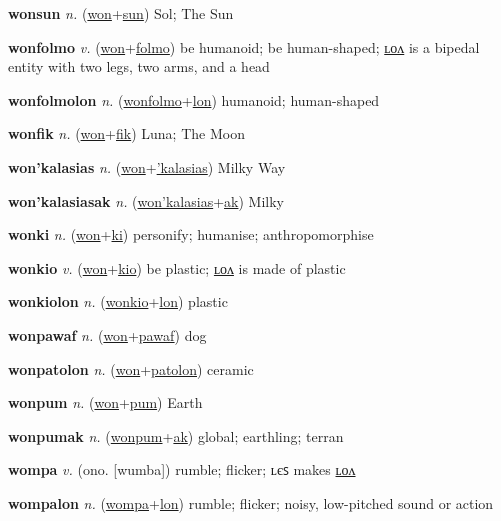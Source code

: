 \textbf{\hypertarget{wonsun}{wonsun}} \textit{n.} (\hyperlink{won}{won}+\allowbreak \hyperlink{sun}{sun})
Sol; The Sun

\textbf{\hypertarget{wonfolmo}{wonfolmo}} \textit{v.} (\hyperlink{won}{won}+\allowbreak \hyperlink{folmo}{folmo})
be humanoid; be human-shaped; \hyperlink{wonfolmolon}{ʟᴏᴧ} is a bipedal entity with two legs, two arms, and a head

\textbf{\hypertarget{wonfolmolon}{wonfolmolon}} \textit{n.} (\hyperlink{wonfolmo}{wonfolmo}+\allowbreak \hyperlink{lon}{lon})
humanoid; human-shaped

\textbf{\hypertarget{wonfik}{wonfik}} \textit{n.} (\hyperlink{won}{won}+\allowbreak \hyperlink{fik}{fik})
Luna; The Moon

\textbf{\hypertarget{won'kalasias}{won'kalasias}} \textit{n.} (\hyperlink{won}{won}+\allowbreak \hyperlink{'kalasias}{'kalasias})
Milky Way

\textbf{\hypertarget{won'kalasiasak}{won'kalasiasak}} \textit{n.} (\hyperlink{won'kalasias}{won'kalasias}+\allowbreak \hyperlink{ak}{ak})
Milky

\textbf{\hypertarget{wonki}{wonki}} \textit{n.} (\hyperlink{won}{won}+\allowbreak \hyperlink{ki}{ki})
personify; humanise; anthropomorphise

\textbf{\hypertarget{wonkio}{wonkio}} \textit{v.} (\hyperlink{won}{won}+\allowbreak \hyperlink{kio}{kio})
be plastic; \hyperlink{wonkiolon}{ʟᴏᴧ} is made of plastic

\textbf{\hypertarget{wonkiolon}{wonkiolon}} \textit{n.} (\hyperlink{wonkio}{wonkio}+\allowbreak \hyperlink{lon}{lon})
plastic

\textbf{\hypertarget{wonpawaf}{wonpawaf}} \textit{n.} (\hyperlink{won}{won}+\allowbreak \hyperlink{pawaf}{pawaf})
dog

\textbf{\hypertarget{wonpatolon}{wonpatolon}} \textit{n.} (\hyperlink{won}{won}+\allowbreak \hyperlink{patolon}{patolon})
ceramic

\textbf{\hypertarget{wonpum}{wonpum}} \textit{n.} (\hyperlink{won}{won}+\allowbreak \hyperlink{pum}{pum})
Earth

\textbf{\hypertarget{wonpumak}{wonpumak}} \textit{n.} (\hyperlink{wonpum}{wonpum}+\allowbreak \hyperlink{ak}{ak})
global; earthling; terran

\textbf{\hypertarget{wompa}{wompa}} \textit{v.} (ono. [wumba])
rumble; flicker; ʟєꜱ makes \hyperlink{wompalon}{ʟᴏᴧ}

\textbf{\hypertarget{wompalon}{wompalon}} \textit{n.} (\hyperlink{wompa}{wompa}+\allowbreak \hyperlink{lon}{lon})
rumble; flicker; noisy, low-pitched sound or action

